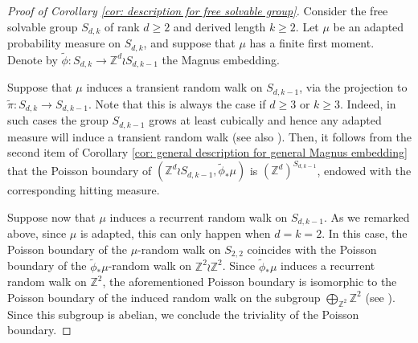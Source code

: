 \documentclass[reqno,oneside,11pt]{amsart}
\newcommand{\Z}{\mathbb{Z}}
\theoremstyle{plain}
\theoremstyle{definition}
\begin{document}
\begin{proof}[Proof of Corollary \ref{cor: description for free solvable group}]
		Consider the free solvable group $S_{d,k}$ of rank $d\ge 2$ and derived length $k\ge 2$. Let $\mu$ be an adapted probability measure on $S_{d,k}$, and suppose that $\mu$ has a finite first moment. Denote by $\widetilde{\phi}:S_{d,k}\to \Z^d\wr S_{d,k-1}$ the Magnus embedding.
	
	Suppose that $\mu$ induces a transient random walk on $S_{d,k-1}$, via the projection to $\widetilde{\pi}:S_{d,k}\to S_{d,k-1}$. Note that this is always the case if $d\ge 3$ or $k\ge 3$. Indeed, in such cases the group $S_{d,k-1}$ grows at least cubically and hence any adapted measure will induce a transient random walk \cite{Varopoulos1986} (see also \cite[Theorem 3.24]{Woess2000}). Then, it follows from the second item of Corollary \ref{cor: general description for general Magnus embedding} that the Poisson boundary of $(\Z^d\wr S_{d,k-1},\widetilde{\phi}_{*}\mu)$ is $(\Z^d)^{S_{d,k-1}}$, endowed with the corresponding hitting measure.
	
 
	 Suppose now that $\mu$ induces a recurrent random walk on $S_{d,k-1}$. As we remarked above, since $\mu$ is adapted, this can only happen when $d=k=2$. In this case, the Poisson boundary of the $\mu$-random walk on  $S_{2,2}$ coincides with the Poisson boundary of the $\widetilde{\phi}_{*}\mu$-random walk on $\Z^2\wr \Z^2$. Since $\widetilde{\phi}_{*}\mu$ induces a recurrent random walk on $\Z^2$, the aforementioned Poisson boundary is isomorphic to the Poisson boundary of the induced random walk on the subgroup $\bigoplus_{\Z^2}\Z^2$ (see \cite[Lemma 4.2]{Furstenberg1971}). Since this subgroup is abelian, we conclude the triviality of the Poisson boundary.
\end{proof}

	


\end{document}
